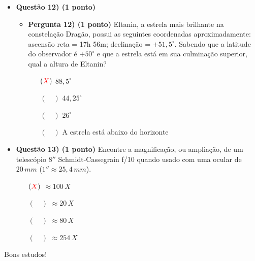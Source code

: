 \documentclass[a4paper, 12pt]{article}
\newcommand{\red}[1]{\textcolor{red}{#1}}
\begin{document}
\begin{flushleft}
\begin{itemize}
        \item \textbf{Questão 12) (1 ponto)}
            \begin{itemize}
                \item \textbf{Pergunta 12) (1 ponto)} Eltanin, a estrela mais brilhante na constelação Dragão, possui as seguintes coordenadas aproximadamente: ascensão reta = 17h 56m; declinação = $+51,5^{\circ}$. Sabendo que a latitude do observador é $+50^{\circ}$ e que a estrela está em sua culminação superior, qual a altura de Eltanin?
                    \begin{itemize}
                        \item[$(\red{X})$] $88,5^{\circ}$
                        \item[$(\quad)$] $44,25^{\circ}$
                        \item[$(\quad)$] $26^{\circ}$
                        \item[$(\quad)$] A estrela está abaixo do horizonte
                    \end{itemize}
            \end{itemize}
        
        \item \textbf{Questão 13) (1 ponto)} Encontre a magnificação, ou ampliação, de um telescópio $8''$ Schmidt-Cassegrain f/10 quando usado com uma ocular de $20 \, mm$ ($1'' \approx 25,4 \, mm$).
            \begin{itemize}
                \item[$(\red{X})$] $\approx 100 \, X$
                \item[$(\quad)$] $\approx 20 \, X$
                \item[$(\quad)$] $\approx 80 \, X$
                \item[$(\quad)$] $\approx 254 \, X$
            \end{itemize}
            
    \end{itemize} \end{flushleft}

    \begin{flushright}
		\begin{large}
			Bons estudos!
		\end{large}
	\end{flushright}
\end{document}
